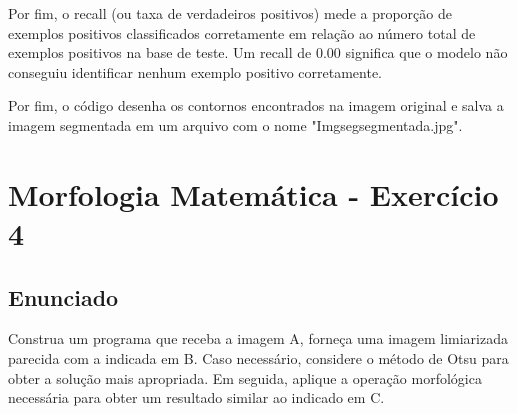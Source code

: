 \documentclass[10pt,a4paper]{article}
\begin{document}
Por fim, o recall (ou taxa de verdadeiros positivos) mede a proporção de exemplos positivos classificados corretamente em relação ao número total de exemplos positivos na base de teste. Um recall de 0.00 significa que o modelo não conseguiu identificar nenhum exemplo positivo corretamente. 

Por fim, o código desenha os contornos encontrados na imagem original e salva a imagem segmentada em um arquivo com o nome "Img\textunderscore seg\textunderscore segmentada.jpg". 

\pagebreak

\section{Morfologia Matemática - Exercício 4}

\subsection{Enunciado}

\begin{flushleft}
Construa um programa que receba a imagem A, forneça uma imagem limiarizada parecida com a indicada em B. Caso necessário, considere o método de Otsu para obter a solução mais apropriada. Em seguida, aplique a operação morfológica necessária para obter um resultado similar ao indicado em C.
\end{flushleft}

\begin{figure}[H]
    \centering
    \qquad
    \qquad
    \qquad
\end{figure}
\end{document}
